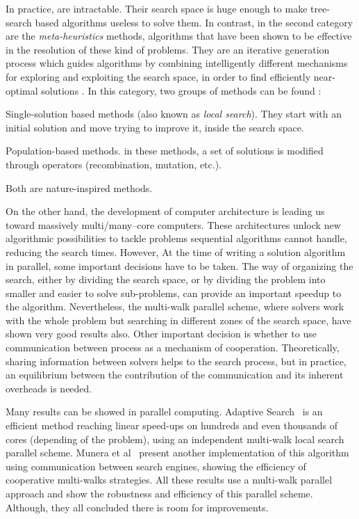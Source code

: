 In practice, \CSPs{} are intractable. Their search space is huge enough to make tree-search based algorithms useless to solve them. In contrast, in the second category are the \textit{meta-heuristics} methods, algorithms that have been shown to be effective in the resolution of these kind of problems. They are an iterative generation process which guides algorithms by combining intelligently different mechanisms for exploring and exploiting the search space, in order to find efficiently near-optimal solutions \cite{Osman1996}. In this category, two groups of methods can be found \cite{Boussaid2013}: \begin{inparaenum}[a)] \item Single-solution based methods (also known as \textit{local search}). They start with an initial solution and move trying to improve it, inside the search space. \item Population-based methods. in these methods, a set of solutions is modified through operators (recombination, mutation, etc.). \end{inparaenum} Both are nature-inspired methods.

On the other hand, the development of computer architecture is leading us toward massively multi/many--core computers. These architectures unlock new algorithmic possibilities to tackle problems sequential algorithms cannot handle, reducing the search times.  However,  At the time of writing a solution algorithm in parallel, some important decisions have to be taken. The way of organizing the search, either by dividing the search space, or by dividing the problem into smaller and easier to solve sub-problems, can provide an important speedup to the algorithm. Nevertheless, the multi-walk parallel scheme, where solvers work with the whole problem but searching in different zones of the search space, have shown very good results also. Other important decision is whether to use communication between process as a mechanism of cooperation. Theoretically, sharing information between solvers helps to the search process, but in practice, an equilibrium between the contribution of the communication and its inherent overheads is needed.

Many results can be showed in parallel computing. Adaptive Search~\cite{Diaz} is an efficient method reaching linear speed-ups on hundreds and even thousands of cores (depending of the problem), using an independent multi-walk local search parallel scheme. Munera et al~\cite{Munera} present another implementation of this algorithm using communication between search engines, showing the efficiency of cooperative multi-walks strategies. All these results use a multi-walk parallel approach and show the robustness and efficiency of this parallel scheme. Although, they all concluded there is room for improvements. 

